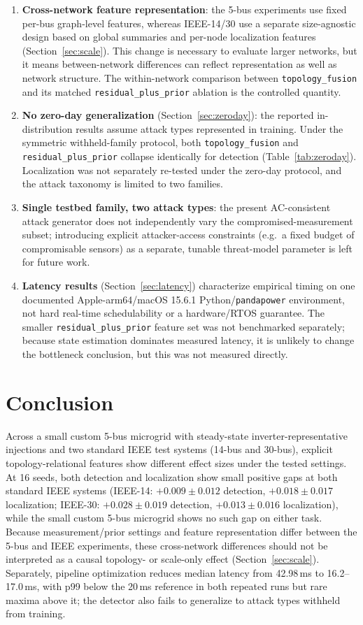 \documentclass[conference]{IEEEtran}
\begin{document}
\begin{enumerate}
\item \textbf{Cross-network feature representation}: the 5-bus experiments use fixed per-bus graph-level features, whereas IEEE-14/30 use a separate size-agnostic design based on global summaries and per-node localization features (Section~\ref{sec:scale}). This change is necessary to evaluate larger networks, but it means between-network differences can reflect representation as well as network structure. The within-network comparison between \texttt{topology\_fusion} and its matched \texttt{residual\_plus\_prior} ablation is the controlled quantity.
\item \textbf{No zero-day generalization} (Section~\ref{sec:zeroday}): the reported in-distribution results assume attack types represented in training. Under the symmetric withheld-family protocol, both \texttt{topology\_fusion} and \texttt{residual\_plus\_prior} collapse identically for detection (Table~\ref{tab:zeroday}). Localization was not separately re-tested under the zero-day protocol, and the attack taxonomy is limited to two families.
\item \textbf{Single testbed family, two attack types}: the present AC-consistent attack generator does not independently vary the compromised-measurement subset; introducing explicit attacker-access constraints (e.g.\ a fixed budget of compromisable sensors) as a separate, tunable threat-model parameter is left for future work.
\item \textbf{Latency results} (Section~\ref{sec:latency}) characterize empirical timing on one documented Apple-arm64/macOS 15.6.1 Python/\texttt{pandapower} environment, not hard real-time schedulability or a hardware/RTOS guarantee. The smaller \texttt{residual\_plus\_prior} feature set was not benchmarked separately; because state estimation dominates measured latency, it is unlikely to change the bottleneck conclusion, but this was not measured directly.
\end{enumerate}

\section{Conclusion}

Across a small custom 5-bus microgrid with steady-state inverter-representative injections and two standard IEEE test systems (14-bus and 30-bus), explicit topology-relational features show different effect sizes under the tested settings. At 16 seeds, both detection and localization show small positive gaps at both standard IEEE systems (IEEE-14: $+0.009\pm0.012$ detection, $+0.018\pm0.017$ localization; IEEE-30: $+0.028\pm0.019$ detection, $+0.013\pm0.016$ localization), while the small custom 5-bus microgrid shows no such gap on either task. Because measurement/prior settings and feature representation differ between the 5-bus and IEEE experiments, these cross-network differences should not be interpreted as a causal topology- or scale-only effect (Section~\ref{sec:scale}). Separately, pipeline optimization reduces median latency from 42.98\,ms to 16.2--17.0\,ms, with p99 below the 20\,ms reference in both repeated runs but rare maxima above it; the detector also fails to generalize to attack types withheld from training.
\end{document}
